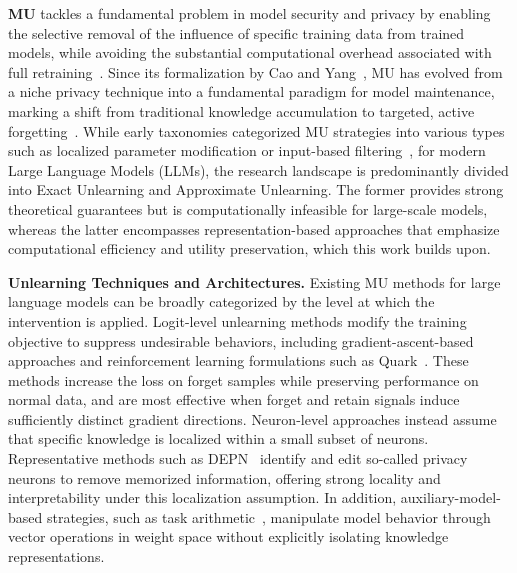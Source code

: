 \textbf{MU} tackles a fundamental problem in model security and privacy by enabling the selective removal of the influence of specific training data from trained models, while avoiding the substantial computational overhead associated with full retraining~\cite{kumar2025machine,qu2025frontier}. Since its formalization by Cao and Yang~\cite{7163042}, MU has evolved from a niche privacy technique into a fundamental paradigm for model maintenance, marking a shift from traditional knowledge accumulation to targeted, active forgetting~\cite{nguyen2025survey}. While early taxonomies categorized MU strategies into various types such as localized parameter modification or input-based filtering~\cite{geng2025comprehensive}, for modern Large Language Models (LLMs), the research landscape is predominantly divided into Exact Unlearning and Approximate Unlearning. The former provides strong theoretical guarantees but is computationally infeasible for large-scale models, whereas the latter encompasses representation-based approaches that emphasize computational efficiency and utility preservation, which this work builds upon.

\noindent\textbf{Unlearning Techniques and Architectures.}
Existing MU methods for large language models can be broadly categorized by the level at which the intervention is applied.
Logit-level unlearning methods modify the training objective to suppress undesirable behaviors, including gradient-ascent-based approaches and reinforcement learning formulations such as Quark~\cite{lu2022quark}. These methods increase the loss on forget samples while preserving performance on normal data, and are most effective when forget and retain signals induce sufficiently distinct gradient directions. Neuron-level approaches instead assume that specific knowledge is localized within a small subset of neurons. Representative methods such as DEPN~\cite{wu-etal-2023-depn} identify and edit so-called privacy neurons to remove memorized information, offering strong locality and interpretability under this localization assumption. In addition, auxiliary-model-based strategies, such as task arithmetic~\cite{ilharco2022editing}, manipulate model behavior through vector operations in weight space without explicitly isolating knowledge representations.

